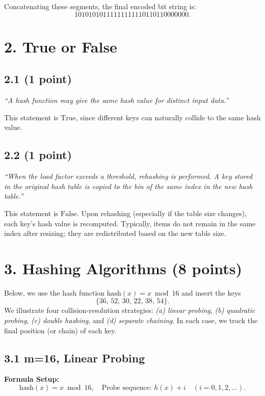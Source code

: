 \documentclass[12pt]{article}
\begin{document}
	\noindent Concatenating these segments, the final encoded bit string is:
	\[
	\boxed{10101010111111111110110110000000}.
	\]
	
	\section*{2. True or False}
	
	\subsection*{2.1 (1 point)}
	\emph{``A hash function may give the same hash value for distinct input data.''}
	
	\noindent This statement is \(\boxed{\text{True}}\), since different keys can naturally collide to the same hash value.
	
	\subsection*{2.2 (1 point)}
	\emph{``When the load factor exceeds a threshold, rehashing is performed. A key stored in the original hash table is copied to the bin of the same index in the new hash table.''}
	
	\noindent This statement is \(\boxed{\text{False}}\). Upon rehashing (especially if the table size changes), each key’s hash value is recomputed. Typically, items do not remain in the same index after resizing; they are redistributed based on the new table size.
	
	\newpage 
	
	\section*{3. Hashing Algorithms (8 points)}
	
	Below, we use the hash function \(\text{hash}(x) = x \bmod 16\) and insert the keys 
	\[
	\{36,\,52,\,30,\,22,\,38,\,54\}.
	\]
	We illustrate four collision-resolution strategies: 
	\emph{(a) linear probing}, 
	\emph{(b) quadratic probing}, 
	\emph{(c) double hashing}, 
	and 
	\emph{(d) separate chaining}. 
	In each case, we track the final position (or chain) of each key.
	
	\subsection*{3.1 m=16, Linear Probing}
	\noindent
	\textbf{Formula Setup:} 
	\[
	\text{hash}(x) = x \bmod 16, 
	\quad 
	\text{Probe sequence: }h(x) + i \quad (i = 0,1,2,\dots).
	\]
	
\end{document}
